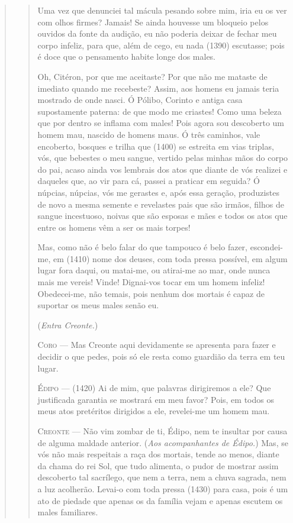 \begin{verse}
\begin{verse}
Uma vez que denunciei tal mácula pesando sobre mim, iria eu os ver com
olhos firmes? Jamais! Se ainda houvesse um bloqueio pelos ouvidos da
fonte da audição, eu não poderia deixar de fechar meu corpo infeliz,
para que, além de cego, eu nada (1390) escutasse; pois é doce que o
pensamento habite longe dos males.

Oh, Citéron, por que me aceitaste? Por que não me mataste de imediato
quando me recebeste? Assim, aos homens eu jamais teria mostrado de onde
nasci. Ó Pólibo, Corinto e antiga casa supostamente paterna: de que modo
me criastes! Como uma beleza que por dentro se inflama com males! Pois
agora sou descoberto um homem mau, nascido de homens maus. Ó três
caminhos, vale encoberto, bosques e trilha que (1400) se estreita em
vias triplas, vós, que bebestes o meu sangue, vertido pelas minhas mãos
do corpo do pai, acaso ainda vos lembrais dos atos que diante de vós
realizei e daqueles que, ao vir para cá, passei a praticar em seguida? Ó
núpcias, núpcias, vós me gerastes e, após essa geração, produzistes de
novo a mesma semente e revelastes pais que são irmãos, filhos de sangue
incestuoso, noivas que são esposas e mães e todos os atos que entre os
homens vêm a ser os mais torpes!

Mas, como não é belo falar do que tampouco é belo fazer, escondei-me, em
(1410) nome dos deuses, com toda pressa possível, em algum lugar fora
daqui, ou matai-me, ou atirai-me ao mar, onde nunca mais me vereis!
Vinde! Dignai-vos tocar em um homem infeliz! Obedecei-me, não temais,
pois nenhum dos mortais é capaz de suportar os meus males senão eu.

(\emph{Entra Creonte.})

\textsc{Coro} --- Mas Creonte aqui devidamente se apresenta para fazer e decidir o que
pedes, pois só ele resta como guardião da terra em teu lugar.

\textsc{Édipo} --- (1420) Ai de mim, que palavras dirigiremos a ele? Que justificada
garantia se mostrará em meu favor? Pois, em todos os meus atos
pretéritos dirigidos a ele, revelei-me um homem mau.

\textsc{Creonte} --- Não vim zombar de ti, Édipo, nem te insultar por causa de alguma maldade
anterior. (\emph{Aos acompanhantes de Édipo.}) Mas, se vós não mais
respeitais a raça dos mortais, tende ao menos, diante da chama do rei
Sol, que tudo alimenta, o pudor de mostrar assim descoberto tal
sacrílego, que nem a terra, nem a chuva sagrada, nem a luz acolherão.
Levai-o com toda pressa (1430) para casa, pois é um ato de piedade que
apenas os da família vejam e apenas escutem os males familiares.


\end{verse}
\end{verse}
